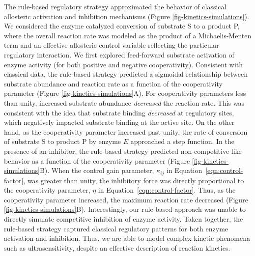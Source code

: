 \documentclass[processes,article,accept,moreauthors,pdftex,12pt,a4paper]{mdpi}
\begin{document}
The rule-based regulatory strategy approximated the behavior of classical allosteric activation and inhibition mechanisms (Figure \ref{fig-kinetics-simulations}). 
We considered the enzyme catalyzed conversion of substrate S to a product P, where the overall reaction rate was modeled as the product of a Michaelis-Menten term and an effective allosteric control variable reflecting the particular regulatory interaction. 
We first explored feed-forward substrate activation of enzyme activity (for both positive and negative cooperativity). 
Consistent with classical data, the rule-based strategy predicted a sigmoidal relationship between substrate abundance and reaction rate as a function of the cooperativity parameter (Figure \ref{fig-kinetics-simulations}A). 
For cooperativity parameters less than unity, increased substrate abundance \textit{decreased} the reaction rate. 
This was consistent with the idea that substrate binding \textit{decreased} at regulatory sites, which negatively impacted substrate binding at the active site. 
On the other hand, as the cooperativity parameter increased past unity, the rate of conversion of substrate S to product P by enzyme $E$ approached a step function. 
In the presence of an inhibitor, the rule-based strategy predicted non-competitive like behavior as a function of the cooperativity parameter (Figure \ref{fig-kinetics-simulations}B). 
When the control gain parameter, $\kappa_{ij}$ in Equation~\eqref{eqn:control-factor}, was greater than unity, the inhibitory force was directly proportional to the cooperativity parameter, $\eta$ in Equation~\eqref{eqn:control-factor}. 
Thus, as the cooperativity parameter increased, the maximum reaction rate decreased (Figure \ref{fig-kinetics-simulations}B). 
Interestingly, our rule-based approach was unable to directly simulate competitive inhibition of enzyme activity. 
Taken together, the rule-based strategy captured classical regulatory patterns for both enzyme activation and inhibition. 
Thus, we are able to model complex kinetic phenomena such as ultrasensitivity, despite an effective description of reaction kinetics. 
\end{document}
